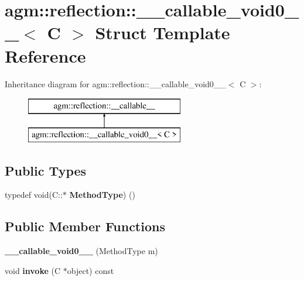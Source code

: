 \hypertarget{structagm_1_1reflection_1_1____callable__void0____}{}\section{agm\+:\+:reflection\+:\+:\+\_\+\+\_\+callable\+\_\+void0\+\_\+\+\_\+$<$ C $>$ Struct Template Reference}
\label{structagm_1_1reflection_1_1____callable__void0____}
Inheritance diagram for agm\+:\+:reflection\+:\+:\+\_\+\+\_\+callable\+\_\+void0\+\_\+\+\_\+$<$ C $>$\+:\begin{figure}[H]
\begin{center}
\leavevmode
\includegraphics[height=2.000000cm]{structagm_1_1reflection_1_1____callable__void0____}
\end{center}
\end{figure}
\subsection*{Public Types}
\begin{DoxyCompactItemize}
\item 
typedef void(C\+::$\ast$ {\bfseries Method\+Type}) ()\hypertarget{structagm_1_1reflection_1_1____callable__void0_____a5ed04d6e58f9300f6ae70b085f07b123}{}\label{structagm_1_1reflection_1_1____callable__void0_____a5ed04d6e58f9300f6ae70b085f07b123}

\end{DoxyCompactItemize}
\subsection*{Public Member Functions}
\begin{DoxyCompactItemize}
\item 
{\bfseries \+\_\+\+\_\+callable\+\_\+void0\+\_\+\+\_\+} (Method\+Type m)\hypertarget{structagm_1_1reflection_1_1____callable__void0_____af9f480b9e31f0ea8b8d3cfde34ccbb11}{}\label{structagm_1_1reflection_1_1____callable__void0_____af9f480b9e31f0ea8b8d3cfde34ccbb11}

\item 
void {\bfseries invoke} (C $\ast$object) const \hypertarget{structagm_1_1reflection_1_1____callable__void0_____af88a79736eac4ddd2782a58448366dd8}{}\label{structagm_1_1reflection_1_1____callable__void0_____af88a79736eac4ddd2782a58448366dd8}

\end{DoxyCompactItemize}
